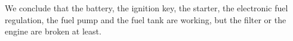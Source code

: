 \documentclass[paper=a4, fontsize=11pt]{scrartcl} %
\numberwithin{equation}{section} %
\numberwithin{figure}{section} %
\numberwithin{table}{section} %
\begin{document}
		
		We conclude that the battery, the ignition key, the starter, the electronic fuel regulation, the fuel pump and the fuel tank are working, but the filter or the engine are broken at least.\\
		

\end{document}
